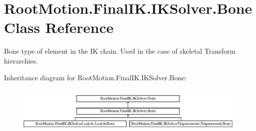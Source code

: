 \hypertarget{class_root_motion_1_1_final_i_k_1_1_i_k_solver_1_1_bone}{}\section{Root\+Motion.\+Final\+I\+K.\+I\+K\+Solver.\+Bone Class Reference}
\label{class_root_motion_1_1_final_i_k_1_1_i_k_solver_1_1_bone}


Bone type of element in the IK chain. Used in the case of skeletal Transform hierarchies.  


Inheritance diagram for Root\+Motion.\+Final\+I\+K.\+I\+K\+Solver.\+Bone\+:\begin{figure}[H]
\begin{center}
\leavevmode
\includegraphics[height=2.301370cm]{class_root_motion_1_1_final_i_k_1_1_i_k_solver_1_1_bone}
\end{center}
\end{figure}
